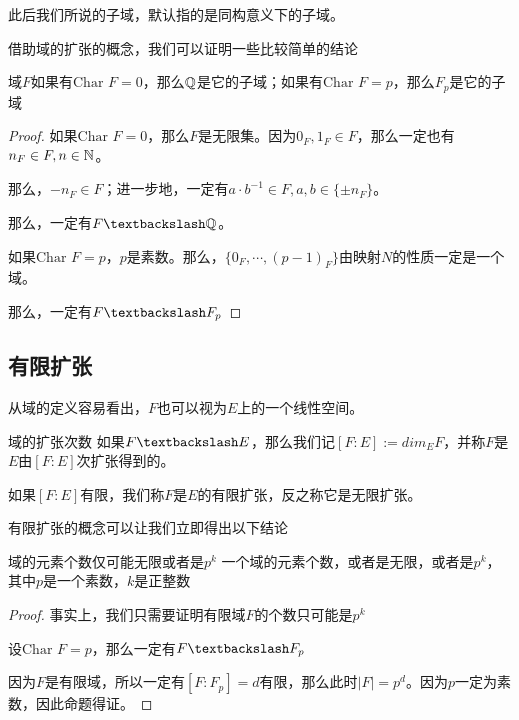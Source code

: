 \documentclass[12pt, a4paper, oneside, UTF8]{ctexbook}
\begin{document}
			此后我们所说的子域，默认指的是同构意义下的子域。

			借助域的扩张的概念，我们可以证明一些比较简单的结论
			\begin{proposition}
				域$F$如果有$\text{Char }F=0$，那么$\mathbb{Q}$是它的子域；如果有$\text{Char }F=p$，那么$F_p$是它的子域
			\end{proposition}
			\begin{proof}
				如果$\text{Char }F=0$，那么$F$是无限集。因为$0_F,1_F \in F$，那么一定也有$n_F \in F,n \in \mathbb{N}$。

				那么，$-n_F \in F$；进一步地，一定有$a \cdot b^{-1} \in F,a,b \in \{\pm n_F\}$。

				那么，一定有$F \textbackslash \Q$。

				如果$\text{Char }F=p$，$p$是素数。那么，$\{0_F,\cdots,(p-1)_F\}$由映射$N$的性质一定是一个域。

				那么，一定有$F \textbackslash F_p$
			\end{proof}
		\subsection{有限扩张}
			从域的定义容易看出，$F$也可以视为$E$上的一个线性空间。
			\begin{defn}{域的扩张次数}{}
				如果$F\textbackslash E$，那么我们记$[F:E]:=dim_E F$，并称$F$是$E$由$[F:E]$次扩张得到的。

				如果$[F:E]$有限，我们称$F$是$E$的有限扩张，反之称它是无限扩张。
			\end{defn}
			有限扩张的概念可以让我们立即得出以下结论
			\begin{them}{域的元素个数仅可能无限或者是$p^k$}{}
				一个域的元素个数，或者是无限，或者是$p^k$，其中$p$是一个素数，$k$是正整数
			\end{them}
			\begin{proof}
				事实上，我们只需要证明有限域$F$的个数只可能是$p^k$

				设$\text{Char }F = p$，那么一定有$F \textbackslash F_p$

				因为$F$是有限域，所以一定有$[F:F_p]=d$有限，那么此时$|F|=p^d$。因为$p$一定为素数，因此命题得证。
			\end{proof}
\end{document}
